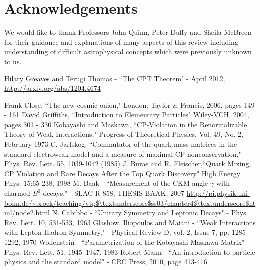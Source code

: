 \documentclass[floatfix,aps,prd,amsmath,amssymb]{revtex4}
\begin{document}
\section{Acknowledgements}
 
 We would like to thank Professors John Quinn, Peter Duffy and Sheila McBreen for their guidance and explanations of many aspects of this review including understanding of difficult astrophysical concepts which were previously unknown to us.   
 
\begin{thebibliography}{10}
Hilary Greaves and Terugi Thomas - ``The CPT Theorem" - April 2012, \url{http://arxiv.org/abs/1204.4674}

Frank Close, ``The new cosmic onion,"  London: Taylor \& Francis, 2006, pages 149 - 161
David Griffiths, ``Introduction to Elementary Particles"  Wiley-VCH, 2004, pages 301 - 330
Kobayashi and Maskawa, ``CP-Violation in the Renormalizable Theory of Weak Interactions," Progress of Theoretical Physics, Vol. 49, No. 2, February 1973
C. Jarlskog, ``Commutator of the quark mass matrices in the standard electroweak model and a measure of maximal CP nonconservation," Phys. Rev. Lett. 55, 1039-1042 (1985)
J. Buras and R. Fleischer,``Quark Mixing, CP Violation and Rare Decays After the Top Quark Discovery" High Energy Phys. 15:65-238, 1998
M. Baak - ``Measurement of the CKM angle $\gamma$ with charmed $B^{0}$ decays," - SLAC-R-858, THESIS-BAAK, 2007
\url{http://pi.physik.uni-bonn.de/~brock/teaching/vtp$\textunderscore$ss03/chapter4$\textunderscore$html/node2.html}
N. Cabibbo - ``Unitary Symmetry and Leptonic Decays" - Phys. Rev. Lett. 10, 531-533, 1963
Glashow, Iliopoulos and Maiani - ``Weak Interactions with Lepton-Hadron Symmetry," - Physical Review D, vol. 2, Issue 7, pp. 1285-1292, 1970
Wolfenstein - ``Parametrization of the Kobayashi-Maskawa Matrix" Phys. Rev. Lett. 51, 1945–1947, 1983 
Robert Mann - ``An introduction to particle physics and the standard model" - CRC Press, 2010, page 413-416


\end{thebibliography}
\end{document}
